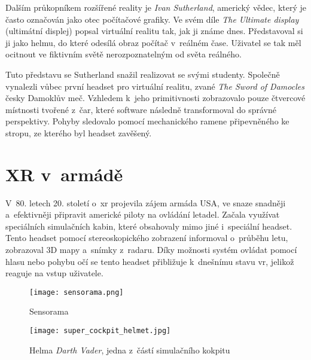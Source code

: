 Dalším průkopníkem rozšířené reality je \textit{Ivan Sutherland}, americký vědec, který je často označován jako otec počítačové grafiky. Ve svém díle \textit{The Ultimate display} (ultimátní displej) popsal virtuální realitu tak, jak ji známe dnes. Představoval si ji jako helmu, do které odesílá obraz počítač v~reálném čase. Uživatel se tak měl ocitnout ve fiktivním světě nerozpoznatelným od světa reálného. \cite{otechnice} \cite{ivan_sutherland_bio}

Tuto představu se Sutherland snažil realizovat se svými studenty. Společně vynalezli vůbec první headset pro virtuální realitu, zvané \textit{The Sword of Damocles} \poml česky Damoklův meč. Vzhledem k~jeho primitivnosti zobrazovalo pouze čtvercové místnosti tvořené z~čar, které software následně transformoval do správné perspektivy. Pohyby sledovalo pomocí mechanického ramene připevněného ke stropu, ze kterého byl headset zavěšený. \cite{otechnice} \cite{Rheingold_1992}

\section{XR v~armádě}

V~80. letech 20. století o~\gls{xr} projevila zájem armáda USA, ve snaze snadněji a~efektivněji připravit americké piloty na ovládání letadel. Začala využívat speciálních simulačních kabin, které obsahovaly mimo jiné i~speciální headset. Tento headset pomocí stereoskopického zobrazení informoval o~průběhu letu, zobrazoval 3D mapy a~snímky z~radaru. Díky možnosti systém ovládat pomocí hlasu nebo pohybu očí se tento headset přibližuje k~dnešnímu stavu \gls{vr}, jelikož reaguje na vstup uživatele. \cite{otechnice}


\begin{figure}[H]
    \centering

    \begin{minipage}{.5\textwidth}
        \centering
        \texttt{[image: sensorama.png]}
        \caption{Sensorama \cite{sensorama_patent}}
        \label{sensorama_fig}
    \end{minipage}%
    \begin{minipage}{.5\textwidth}
        \centering
        \texttt{[image: super\_cockpit\_helmet.jpg]}
        \caption{Helma \textit{Darth Vader}, jedna z~částí simulačního kokpitu \cite{super_cockpit_image}}
        \label{sensorama}
    \end{minipage}

\end{figure}

